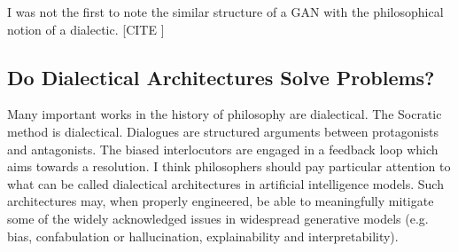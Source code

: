 \documentclass[11pt, oneside]{article}   	%
\begin{document}
I was not the first to note the similar structure of a GAN with the philosophical notion of a dialectic.  [CITE ]









\subsection{Do Dialectical Architectures Solve Problems?}



Many important works in the history of philosophy are dialectical.  The Socratic method is dialectical.  Dialogues are structured arguments between protagonists and antagonists.  The biased interlocutors are engaged in a feedback loop which aims towards a resolution.  I think philosophers should pay particular attention to what can be called dialectical architectures in artificial intelligence models.  Such architectures may, when properly engineered, be able to meaningfully mitigate some of the widely acknowledged issues in widespread generative models (e.g. bias, confabulation or hallucination, explainability and interpretability).
\end{document}
